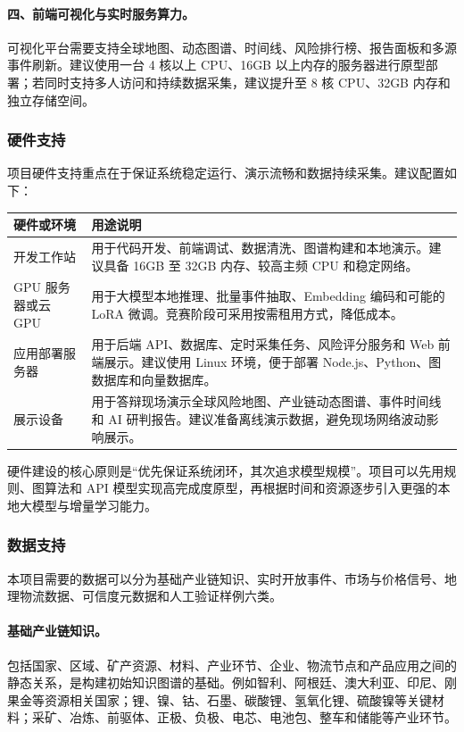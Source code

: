 \documentclass[12pt,a4paper]{article}
\begin{document}
\paragraph{四、前端可视化与实时服务算力。}可视化平台需要支持全球地图、动态图谱、时间线、风险排行榜、报告面板和多源事件刷新。建议使用一台 4 核以上 CPU、16GB 以上内存的服务器进行原型部署；若同时支持多人访问和持续数据采集，建议提升至 8 核 CPU、32GB 内存和独立存储空间。

\subsubsection{硬件支持}

项目硬件支持重点在于保证系统稳定运行、演示流畅和数据持续采集。建议配置如下：

\begin{longtable}{p{}p{}}
\toprule
\textbf{硬件或环境} & \textbf{用途说明} \\
\midrule
开发工作站 & 用于代码开发、前端调试、数据清洗、图谱构建和本地演示。建议具备 16GB 至 32GB 内存、较高主频 CPU 和稳定网络。 \\
\midrule
GPU 服务器或云 GPU & 用于大模型本地推理、批量事件抽取、Embedding 编码和可能的 LoRA 微调。竞赛阶段可采用按需租用方式，降低成本。 \\
\midrule
应用部署服务器 & 用于后端 API、数据库、定时采集任务、风险评分服务和 Web 前端展示。建议使用 Linux 环境，便于部署 Node.js、Python、图数据库和向量数据库。 \\
\midrule
展示设备 & 用于答辩现场演示全球风险地图、产业链动态图谱、事件时间线和 AI 研判报告。建议准备离线演示数据，避免现场网络波动影响展示。 \\
\bottomrule
\end{longtable}

硬件建设的核心原则是“优先保证系统闭环，其次追求模型规模”。项目可以先用规则、图算法和 API 模型实现高完成度原型，再根据时间和资源逐步引入更强的本地大模型与增量学习能力。

\subsubsection{数据支持}

本项目需要的数据可以分为基础产业链知识、实时开放事件、市场与价格信号、地理物流数据、可信度元数据和人工验证样例六类。

\paragraph{基础产业链知识。}包括国家、区域、矿产资源、材料、产业环节、企业、物流节点和产品应用之间的静态关系，是构建初始知识图谱的基础。例如智利、阿根廷、澳大利亚、印尼、刚果金等资源相关国家；锂、镍、钴、石墨、碳酸锂、氢氧化锂、硫酸镍等关键材料；采矿、冶炼、前驱体、正极、负极、电芯、电池包、整车和储能等产业环节。
\end{document}

